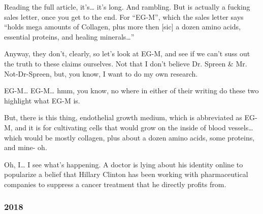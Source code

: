\documentclass[11pt]{article}
\begin{document}
\begin{itemize}
Reading the full article, it’s… it’s long. And rambling. But is actually a fucking sales letter, once you get to the end. For “EG-M”, which the sales letter says “holds mega amounts of Collagen, plus more then [sic] a dozen amino acids, essential proteins, and healing minerals…”

Anyway, they don’t, clearly, so let’s look at EG-M, and see if we can’t suss out the truth to these claims ourselves. Not that I don’t believe Dr. Spreen \& Mr. Not-Dr-Spreen, but, you know, I want to do my own research.

EG-M… EG-M… hmm, you know, no where in either of their writing do these two highlight what EG-M is.

But, there is this thing, endothelial growth medium, which is abbreviated as EG-M, and it is for cultivating cells that would grow on the inside of blood vessels… which would be mostly collagen, plus about a dozen amino acids, some proteins, and mine- oh.

Oh, I… I see what’s happening. A doctor is lying about his identity online to popularize a belief that Hillary Clinton has been working with pharmaceutical companies to suppress a cancer treatment that he directly profits from.
\end{itemize}
\stopcontents[level-4]
\stopcontents[level-3]
\subsubsection*{2018}
\label{sec:org744aa1e}
\startcontents[level-3]
\end{document}
